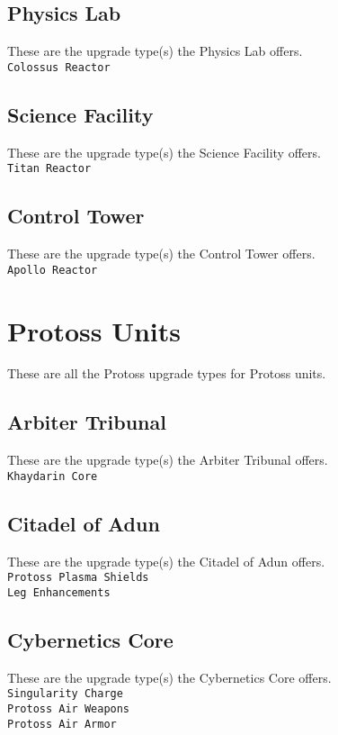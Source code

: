 \subsection{Physics Lab}
These are the upgrade type(s) the Physics Lab offers. \\
\verb|Colossus Reactor|

\subsection{Science Facility}
These are the upgrade type(s) the Science Facility offers. \\
\verb|Titan Reactor|

\subsection{Control Tower}
These are the upgrade type(s) the Control Tower offers. \\
\verb|Apollo Reactor|

\section{Protoss Units}
These are all the Protoss upgrade types for Protoss units. \\

\subsection{Arbiter Tribunal}
These are the upgrade type(s) the Arbiter Tribunal offers. \\
\verb|Khaydarin Core|

\subsection{Citadel of Adun}
These are the upgrade type(s) the Citadel of Adun offers. \\
\verb|Protoss Plasma Shields|\\
\verb|Leg Enhancements|

\subsection{Cybernetics Core}
These are the upgrade type(s) the Cybernetics Core offers. \\
\verb|Singularity Charge|\\
\verb|Protoss Air Weapons|\\
\verb|Protoss Air Armor|\\

